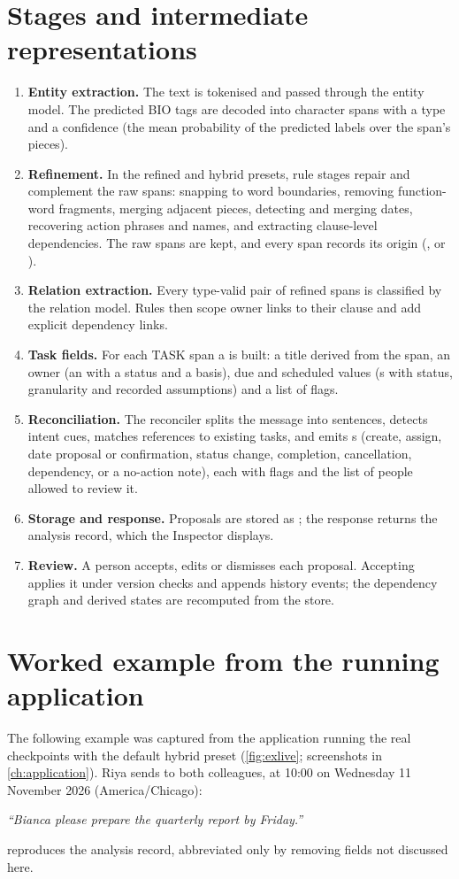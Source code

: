 \section{Stages and intermediate representations}
\begin{enumerate}
  \item \textbf{Entity extraction.} The text is tokenised and passed through the entity model. The predicted BIO tags are decoded into character spans with a type and a confidence (the mean probability of the predicted labels over the span's pieces).
  \item \textbf{Refinement.} In the refined and hybrid presets, rule stages repair and complement the raw spans: snapping to word boundaries, removing function-word fragments, merging adjacent pieces, detecting and merging dates, recovering action phrases and names, and extracting clause-level dependencies. The raw spans are kept, and every span records its origin (,  or ).
  \item \textbf{Relation extraction.} Every type-valid pair of refined spans is classified by the relation model. Rules then scope owner links to their clause and add explicit dependency links.
  \item \textbf{Task fields.} For each TASK span a  is built: a title derived from the span, an owner (an  with a status and a basis), due and scheduled values (s with status, granularity and recorded assumptions) and a list of flags.
  \item \textbf{Reconciliation.} The reconciler splits the message into sentences, detects intent cues, matches references to existing tasks, and emits s (create, assign, date proposal or confirmation, status change, completion, cancellation, dependency, or a no-action note), each with flags and the list of people allowed to review it.
  \item \textbf{Storage and response.} Proposals are stored as ; the response returns the analysis record, which the Inspector displays.
  \item \textbf{Review.} A person accepts, edits or dismisses each proposal. Accepting applies it under version checks and appends history events; the dependency graph and derived states are recomputed from the store.
\end{enumerate}

\section{Worked example from the running application}
\label{sec:walkthrough}
The following example was captured from the application running the real checkpoints with the default hybrid preset (\cref{fig:exlive}; screenshots in \cref{ch:application}). Riya sends to both colleagues, at 10:00 on Wednesday 11 November 2026 (America/Chicago):
\begin{center}
\emph{``Bianca please prepare the quarterly report by Friday.''}
\end{center}
 reproduces the analysis record, abbreviated only by removing fields not discussed here.

